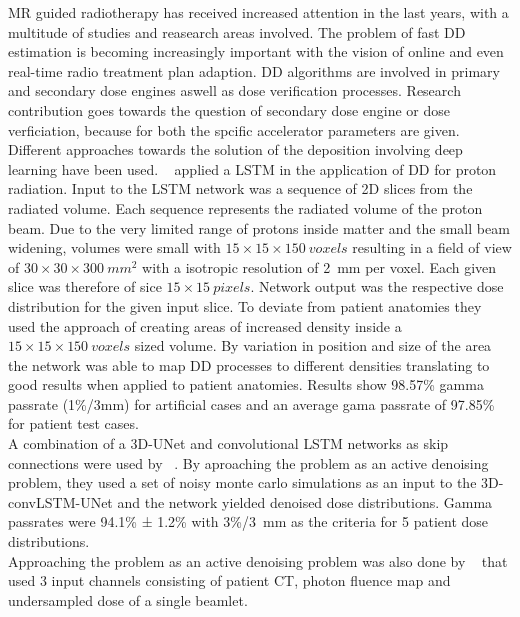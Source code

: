 
MR guided radiotherapy has received increased attention in the last years, with a multitude of studies and reasearch areas involved.
The problem of fast \acs{DD} estimation is becoming increasingly important with the vision of online and even real-time radio treatment plan adaption.
\acs{DD} algorithms are involved in primary and secondary dose engines aswell as dose verification processes. 
Research contribution goes towards the question of secondary dose engine or dose verficiation, because for both the spcific accelerator parameters are given.\\
Different approaches towards the solution of the deposition involving deep learning have been used. 
\citeauthor{neishabouri_long_2021}~\cite{neishabouri_long_2021} applied a \ac{LSTM} in the application of \acs{DD} for proton radiation.
Input to the \acs{LSTM} network was a sequence of 2D slices from the radiated volume.
Each sequence represents the radiated volume of the proton beam.
Due to the very limited range of protons inside matter and the small beam widening, volumes were small with $15 \times 15 \times 150~voxels$ resulting in a field of view of $30 \times 30 \times 300~mm^2$ with a isotropic resolution of 2~mm per voxel.
Each given slice was therefore of sice $15 \times 15~pixels$.
Network output was the respective dose distribution for the given input slice.
To deviate from patient anatomies they used the approach of creating areas of increased density inside a $15 \times 15 \times 150~voxels$ sized volume.
By variation in position and size of the area the network was able to map \acs{DD} processes to different densities translating to good results when applied to patient anatomies.
Results show 98.57\% gamma passrate (1\%/3mm) for artificial cases and an average gama passrate of 97.85\% for patient test cases.\\
A combination of a 3D-UNet and convolutional \acs{LSTM} networks as skip connections were used by \citeauthor{de_bruijne_high-particle_2021}~\cite{de_bruijne_high-particle_2021}. By aproaching the problem as an active denoising problem, they used a set of noisy monte carlo simulations as an input to the 3D-convLSTM-UNet and the network yielded denoised dose distributions.
Gamma passrates were 94.1\% ± 1.2\% with 3\%/3~mm as the criteria for 5 patient dose distributions.\\
Approaching the problem as an active denoising problem was also done by \citeauthor{neph_deepmcdose_2019}~\cite{neph_deepmcdose_2019} that used 3 input channels consisting of patient CT, photon fluence map and undersampled dose of a single beamlet.
